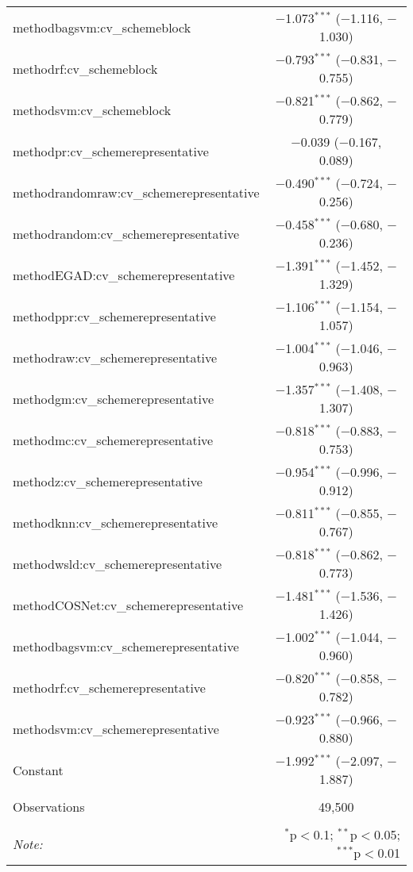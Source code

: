 \begin{table}[!htbp]
\begin{tabular}{@{\extracolsep{5pt}}lc}
  methodbagsvm:cv\_schemeblock & $-$1.073$^{***}$ ($-$1.116, $-$1.030) \\ 
  methodrf:cv\_schemeblock & $-$0.793$^{***}$ ($-$0.831, $-$0.755) \\ 
  methodsvm:cv\_schemeblock & $-$0.821$^{***}$ ($-$0.862, $-$0.779) \\ 
  methodpr:cv\_schemerepresentative & $-$0.039 ($-$0.167, 0.089) \\ 
  methodrandomraw:cv\_schemerepresentative & $-$0.490$^{***}$ ($-$0.724, $-$0.256) \\ 
  methodrandom:cv\_schemerepresentative & $-$0.458$^{***}$ ($-$0.680, $-$0.236) \\ 
  methodEGAD:cv\_schemerepresentative & $-$1.391$^{***}$ ($-$1.452, $-$1.329) \\ 
  methodppr:cv\_schemerepresentative & $-$1.106$^{***}$ ($-$1.154, $-$1.057) \\ 
  methodraw:cv\_schemerepresentative & $-$1.004$^{***}$ ($-$1.046, $-$0.963) \\ 
  methodgm:cv\_schemerepresentative & $-$1.357$^{***}$ ($-$1.408, $-$1.307) \\ 
  methodmc:cv\_schemerepresentative & $-$0.818$^{***}$ ($-$0.883, $-$0.753) \\ 
  methodz:cv\_schemerepresentative & $-$0.954$^{***}$ ($-$0.996, $-$0.912) \\ 
  methodknn:cv\_schemerepresentative & $-$0.811$^{***}$ ($-$0.855, $-$0.767) \\ 
  methodwsld:cv\_schemerepresentative & $-$0.818$^{***}$ ($-$0.862, $-$0.773) \\ 
  methodCOSNet:cv\_schemerepresentative & $-$1.481$^{***}$ ($-$1.536, $-$1.426) \\ 
  methodbagsvm:cv\_schemerepresentative & $-$1.002$^{***}$ ($-$1.044, $-$0.960) \\ 
  methodrf:cv\_schemerepresentative & $-$0.820$^{***}$ ($-$0.858, $-$0.782) \\ 
  methodsvm:cv\_schemerepresentative & $-$0.923$^{***}$ ($-$0.966, $-$0.880) \\ 
  Constant & $-$1.992$^{***}$ ($-$2.097, $-$1.887) \\ 
 \hline \\[-1.8ex] 
Observations & 49,500 \\ 
\hline 
\hline \\[-1.8ex] 
\textit{Note:}  & \multicolumn{1}{r}{$^{*}$p$<$0.1; $^{**}$p$<$0.05; $^{***}$p$<$0.01} \\ 
\end{tabular} 
\end{table} 
